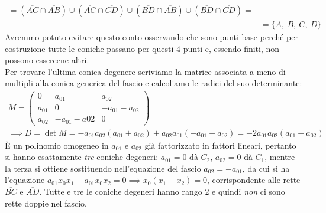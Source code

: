 \begin{demonstration}
\begin{equation*}
\begin{array}{ll}
				=(\overline{AC}\cap\overline{AB}) \cup (\overline{AC}\cap\overline{CD}) \cup (\overline{BD}\cap \overline{AB}) \cup (\overline{BD}\cap \overline{CD})=\\
				&=\{A,\ B,\ C,\ D\}
			\end{array}
		\end{equation*}
	Avremmo potuto evitare questo conto osservando che sono punti base perché per costruzione tutte le coniche passano per questi 4 punti e, essendo finiti, non possono essercene altri.\\
	Per trovare l'ultima conica degenere scriviamo la matrice associata a meno di multipli alla conica generica del fascio e calcoliamo le radici del suo determinante:
		\begin{gather*}
			M=\begin{pmatrix}
				0 & a_{01} & a_{02} \\
				a_{01} & 0 & -a_{01}-a_{02}\\
				a_{02} & -a_{01}-a{02} & 0
			\end{pmatrix}\\
		\implies D=\det M= -a_{01}a_{02}(a_{01}+a_{02})+a_{02}a_{01}(-a_{01}-a_{02}) = -2a_{01}a_{02}(a_{01}+a_{02})
		\end{gather*}
	È un polinomio omogeneo in $a_{01}$ e $a_{02}$ già fattorizzato in fattori lineari, pertanto si hanno esattamente \textit{tre} coniche degeneri: $a_{01}=0$ dà $C_2$, $a_{02}=0$ dà $C_1$, mentre la terza si ottiene sostituendo nell'equazione del fascio $a_{02}=-a_{01}$, da cui si ha l'equazione $a_{01}x_0x_1-a_{01}x_0x_2=0\implies x_0(x_1-x_2)=0$, corrispondente alle rette $\overline{BC}$ e $\overline{AD}$. Tutte e tre le coniche degeneri hanno rango 2 e quindi \textit{non} ci sono rette doppie nel fascio.
\end{demonstration}


